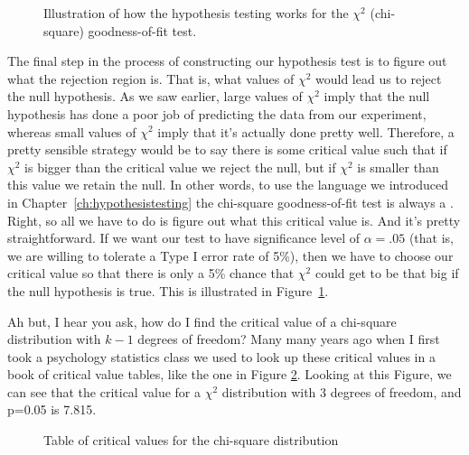 
\begin{figure}[htb]
\begin{center}
\caption{Illustration of how the hypothesis testing works for the $\chi^2$ (chi-square) goodness-of-fit test.}
\label{fig:goftest}
\HR
\end{center}
\end{figure}

The final step in the process of constructing our hypothesis test is to figure out what the rejection region is. That is, what values of $\chi^2$ would lead us to reject the null hypothesis. As we saw earlier, large values of $\chi^2$ imply that the null hypothesis has done a poor job of predicting the data from our experiment, whereas small values of $\chi^2$ imply that it's actually done pretty well. Therefore, a pretty sensible strategy would be to say there is some critical value such that if $\chi^2$ is bigger than the critical value we reject the null, but if $\chi^2$ is smaller than this value we retain the null. In other words, to use the language we introduced in Chapter~\ref{ch:hypothesistesting} the chi-square goodness-of-fit test is always a . Right, so all we have to do is figure out what this critical value is. And it's pretty straightforward. If we want our test to have significance level of $\alpha = .05$ (that is, we are willing to tolerate a Type I error rate of 5\%), then we have to choose our critical value so that there is only a 5\% chance that $\chi^2$ could get to be that big if the null hypothesis is true. This is illustrated in Figure~\ref{fig:goftest}.

Ah but, I hear you ask, how do I find the critical value of a chi-square distribution with $k-1$ degrees of freedom? Many many years ago when I first took a psychology statistics class we used to look up these critical values in a book of critical value tables, like the one in Figure \ref{fig:chisquare.critvalues}. Looking at this Figure, we can see that the critical value for a $\chi^2$ distribution with 3 degrees of freedom, and p=0.05 is 7.815. 

\begin{figure}
\begin{center}
\caption{Table of critical values for the chi-square distribution}
\label{fig:chisquare.critvalues}
\HR
\end{center}
\end{figure}

